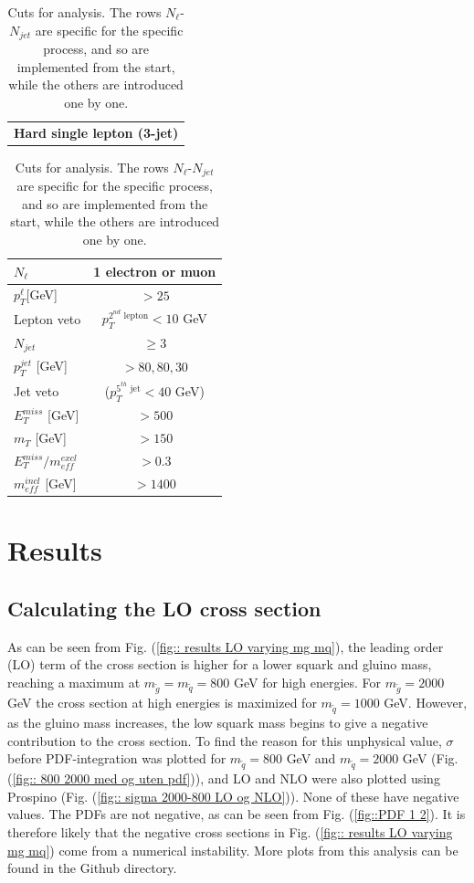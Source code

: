 \documentclass[11pt]{article}
\begin{document}
\begin{table}[H]
\centering
\begin{tabular}{c}
\textbf{Hard single lepton (3-jet)}
\end{tabular}

\begin{tabular}{|l|c|}
\hline
$N_{\ell}$ & 1 electron or muon\\
\hline
$p_T^{\ell}$[GeV] & $> 25$\\
\hline
Lepton veto & $p_T^{2^{nd} \text{ lepton}}< 10$ GeV\\
\hline
$N_{jet}$ & $\geq 3$\\
\hline
$p_T^{jet}$ [GeV] & $>80, 80, 30$\\
\hline
Jet veto & ($p_T^{5^{th} \text{ jet}} < 40$ GeV)\\
\hline
$E_T^{miss}$ [GeV] & $>500$\\
\hline 
$m_T$ [GeV] & $> 150$\\
\hline
$E_T^{miss}/m_{eff}^{excl}$ & $>0.3$\\
\hline 
$m_{eff}^{incl}$ [GeV] & $>1400$\\
\hline
\end{tabular} 
\caption{Cuts for analysis. The rows $N_{\ell}$-$N_{jet}$ are specific for the specific process, and so are implemented from the start, while the others are introduced one by one.}
\label{tab::signal cuts}
\end{table}


\section*{Results}

\subsection*{Calculating the LO cross section}

\begin{flushleft}
As can be seen from Fig. (\ref{fig:: results LO varying mg mq}), the leading order (LO) term of the cross section is higher for a lower squark and gluino mass, reaching a maximum at $m_{\tilde{g}} = m_{\tilde{q}}=800$ GeV for high energies. For $m_{\tilde{g}}=2000$ GeV the cross section at high energies is maximized for $m_{\tilde{q}}=1000$ GeV. However, as the gluino mass increases, the low squark mass begins to give a negative contribution to the cross section. To find the reason for this unphysical value, $\sigma$ before PDF-integration was plotted for $m_{\tilde{q}}=800$ GeV and $m_{\tilde{q}}=2000$ GeV (Fig. (\ref{fig:: 800 2000 med og uten pdf})), and LO and NLO were also plotted using Prospino (Fig. (\ref{fig:: sigma 2000-800 LO og NLO})). None of these have negative values. The PDFs are not negative, as can be seen from Fig. (\ref{fig::PDF 1 2}). It is therefore likely that the negative cross sections in Fig. (\ref{fig:: results LO varying mg mq}) come from a numerical instability. More plots from this analysis can be found in the Github directory.
\end{flushleft}
\end{document}
